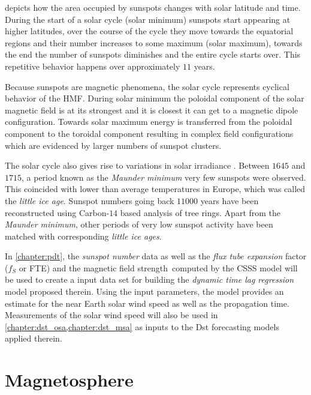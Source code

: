  depicts how the area occupied by sunspots changes with solar latitude 
and time. During the start of a solar cycle (solar minimum) sunspots start appearing at higher 
latitudes, over the course of the cycle they move towards the equatorial regions and their number 
increases to some maximum (solar maximum), towards the end the number of sunspots diminishes and 
the entire cycle starts over. This repetitive behavior happens over approximately $11$ years.

Because sunspots are magnetic phenomena, the solar cycle represents cyclical behavior of the HMF. 
During solar minimum the poloidal component of the solar magnetic field is at its strongest and it 
is closest it can get to a magnetic dipole configuration. Towards solar maximum energy is 
transferred from the poloidal component to the toroidal component resulting in complex field 
configurations which are evidenced by larger numbers of sunspot clusters.

The solar cycle also gives rise to variations in solar irradiance \citep{solarirradiance}. Between 
$1645$ and $1715$, a period known as the \emph{Maunder minimum} very few sunspots were observed. 
This coincided with lower than average temperatures in Europe, which was called the 
\emph{little ice age}. Sunspot numbers going back $11000$ years have been reconstructed using Carbon-$14$ based analysis of tree rings. Apart from the \emph{Maunder minimum}, other periods of very low sunspot activity have been matched with corresponding \emph{little ice ages}.

In \cref{chapter:pdt}, the \emph{sunspot number} data as well as the \emph{flux tube expansion} 
factor ($f_S$ or FTE) and the magnetic field strength computed by the CSSS model will be used to 
create a input data set for building the \emph{dynamic time lag regression} model proposed therein. 
Using the input parameters, the \XX model provides an estimate for the near Earth solar wind speed 
as well as the propagation time. Measurements of the solar wind speed will also be used in 
\cref{chapter:dst_osa,chapter:dst_msa} as inputs to the Dst forecasting models applied therein.


\section{Magnetosphere}\label{sec:mag}


